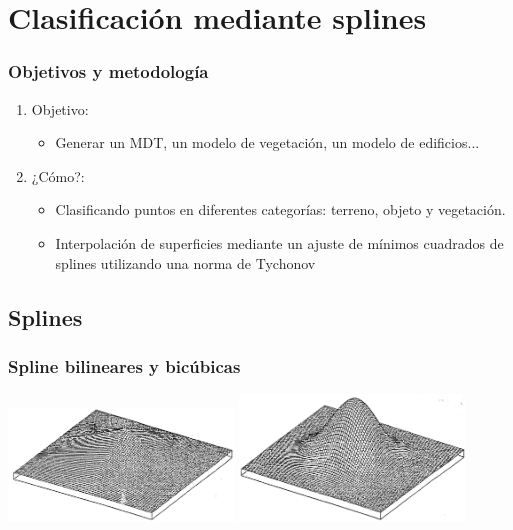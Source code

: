 \section{Clasificación mediante splines}
\begin{frame}
  \frametitle{Objetivos y metodología}
  \begin{enumerate}[<+->]
    \item Objetivo:
    \begin{itemize}
       \item Generar un MDT, un modelo de vegetación, un modelo de edificios...
    \end{itemize}
    \item ¿Cómo?:
    \begin{itemize}
 	\item Clasificando puntos en diferentes categorías: terreno, objeto y
            vegetación.
        \item Interpolación de superficies mediante un ajuste de mínimos
            cuadrados de splines utilizando una norma de Tychonov
    \end{itemize}
  \end{enumerate}
\end{frame}
\subsection{Splines}
\begin{frame}
    \frametitle{Spline bilineares y bicúbicas}
    \begin{center}
        \includegraphics[width=0.45\textwidth]{images/bilinear_spline.jpg}
        \includegraphics[width=0.45\textwidth]{images/bicubic_spline.jpg}
    \end{center}
\end{frame}
